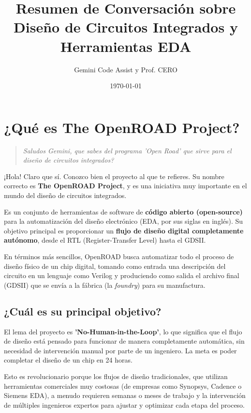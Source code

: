 \documentclass[12pt,a4paper]{article}
\title{Resumen de Conversación sobre Diseño de Circuitos Integrados y Herramientas EDA}
\author{Gemini Code Assist y Prof. CERO}
\date{\today}
\newenvironment{pregunta}
  {\begin{leftbar}\begin{quote}\itshape}
  {\end{quote}\end{leftbar}}
\begin{document}
\maketitle
\tableofcontents
\newpage

\section{¿Qué es The OpenROAD Project?}

\begin{pregunta}
Saludos Gemini, que sabes del programa 'Open Road' que sirve para el diseño de circuitos integrados?
\end{pregunta}

¡Hola! Claro que sí. Conozco bien el proyecto al que te refieres. Su nombre correcto es \textbf{The OpenROAD Project}, y es una iniciativa muy importante en el mundo del diseño de circuitos integrados.

Es un conjunto de herramientas de software de \textbf{código abierto (open-source)} para la automatización del diseño electrónico (EDA, por sus siglas en inglés). Su objetivo principal es proporcionar un \textbf{flujo de diseño digital completamente autónomo}, desde el RTL (Register-Transfer Level) hasta el GDSII.

En términos más sencillos, OpenROAD busca automatizar todo el proceso de diseño físico de un chip digital, tomando como entrada una descripción del circuito en un lenguaje como Verilog y produciendo como salida el archivo final (GDSII) que se envía a la fábrica (la \textit{foundry}) para su manufactura.

\subsection{¿Cuál es su principal objetivo?}

El lema del proyecto es \textbf{'No-Human-in-the-Loop'}, lo que significa que el flujo de diseño está pensado para funcionar de manera completamente automática, sin necesidad de intervención manual por parte de un ingeniero. La meta es poder completar el diseño de un chip en 24 horas.

Esto es revolucionario porque los flujos de diseño tradicionales, que utilizan herramientas comerciales muy costosas (de empresas como Synopsys, Cadence o Siemens EDA), a menudo requieren semanas o meses de trabajo y la intervención de múltiples ingenieros expertos para ajustar y optimizar cada etapa del proceso.
\end{document}
